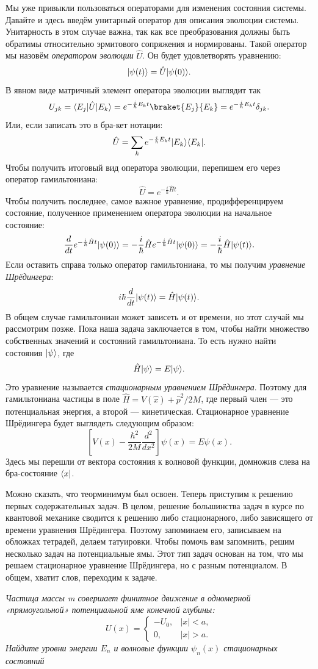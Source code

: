 Мы уже привыкли пользоваться операторами для изменения состояния системы.
Давайте и здесь введём унитарный оператор для описания эволюции системы.
Унитарность в этом случае важна, так как все преобразования должны быть
обратимы относительно эрмитового сопряжения и нормированы. Такой оператор мы
назовём \textit{оператором эволюции} $\hat{U}$. Он будет удовлетворять
уравнению:
\[
  \lvert\psi(t)\rangle = \hat{U} \lvert\psi(0)\rangle.
\]
В явном виде матричный элемент оператора эволюции выглядит так
\[
  U_{jk} = \bra{E_j} \hat{U} \ket{E_k} = e^{-\frac{i}{\hbar}E_k t} \braket{E_j}{E_k} = e^{-\frac{i}{\hbar} E_k t}\delta_{jk}.
\]
Или, если записать это в бра-кет нотации:
\[
  \hat{U} = \sum_{k} e^{-\frac{i}{\hbar} E_k t} \lvert E_k\rangle \langle E_k\rvert.
\]
Чтобы получить итоговый вид оператора эволюции, перепишем его через оператор
гамильтониана:
\[
  \hat{U} = e^{-\frac{i}{\hbar} \hat{H} t}.
\]
Чтобы получить последнее, самое важное уравнение, продифференцируем состояние,
полученное применением оператора эволюции на начальное состояние:
\[
  \frac{d}{dt} e^{-\frac{i}{\hbar} \hat{H} t} \lvert\psi(0)\rangle = -\frac{i}{\hbar} \hat{H} e^{-\frac{i}{\hbar} \hat{H} t} \lvert\psi(0)\rangle = -\frac{i}{\hbar} \hat{H} \lvert\psi(t)\rangle.
\]
Если оставить справа только оператор гамильтониана, то мы получим
\textit{уравнение Шрёдингера}:
\[
  i \hbar \frac{d}{dt} \lvert\psi(t)\rangle = \hat{H} \lvert\psi(t)\rangle.
\]
В общем случае гамильтониан может зависеть и от времени, но этот случай мы
рассмотрим позже. Пока наша задача заключается в том, чтобы найти множество
собственных значений и состояний гамильтониана. То есть нужно найти состояния
$\lvert\psi\rangle$, где
\[
  \hat{H} \lvert\psi\rangle = E \lvert\psi\rangle.
\]
Это уравнение называется \textit{стационарным уравнением Шрёдингера}. Поэтому
для гамильтониана частицы в поле $\hat{H} = V(\hat{x}) + \hat{p}^2 / 2M$, где
первый член --- это потенциальная энергия, а второй --- кинетическая.
Стационарное уравнение Шрёдингера будет выглядеть следующим образом:
\[
  \left[V(x) - \frac{\hbar^2}{2M} \frac{d^2}{dx^2}\right] \psi(x) = E \psi(x).
\]
Здесь мы перешли от вектора состояния к волновой функции, домножив слева на
бра-состояние $\langle x\rvert$.

Можно сказать, что теорминимум был освоен. Теперь приступим к решению первых
содержательных задач. В целом, решение большинства задач в курсе по квантовой
механике сводится к решению либо стационарного, либо зависящего от времени
уравнения Шрёдингера. Поэтому запоминаем его, записываем на обложках тетрадей,
делаем татуировки. Чтобы помочь вам запомнить, решим несколько задач на
потенциальные ямы. Этот тип задач основан на том, что мы решаем стационарное
уравнение Шрёдингера, но с разным потенциалом. В общем, хватит слов, переходим
к задаче.
\begin{exercise}\label{ex:rect-well}
  \textit{Частица массы m совершает финитное движение в одномерной
    «прямоугольной» потенциальной яме конечной глубины:}
  \[
    U(x) =
    \begin{cases}
      -U_0,& |x| < a,\\
      0, & |x| > a.
    \end{cases}
  \]
  \textit{Найдите уровни энергии $E_n$ и волновые функции $\psi_n(x)$
    стационарных состояний}
\end{exercise}


